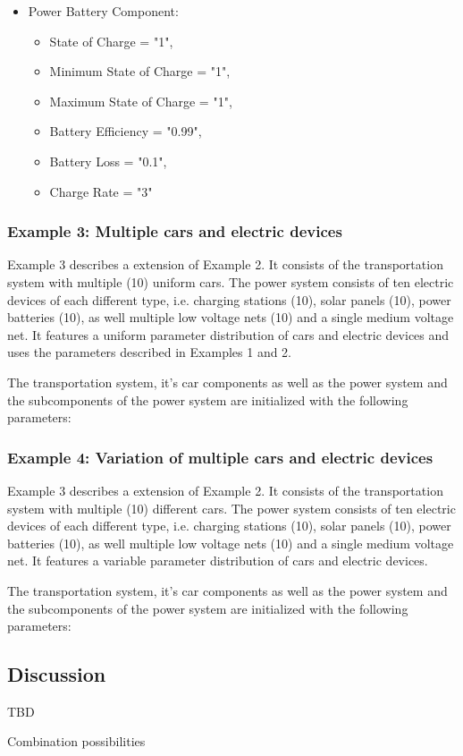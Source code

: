 \begin{itemize}
	\item Power Battery Component:
	\begin{itemize}
		\item State of Charge = "1",
		\item Minimum State of Charge = "1",
		\item Maximum State of Charge = "1", 
		\item Battery Efficiency = "0.99",
		\item Battery Loss = "0.1",
		\item Charge Rate = "3"
	\end{itemize}	
			
\end{itemize}


\subsubsection{Example 3: Multiple cars and electric devices}
Example 3 describes a extension of Example 2. It consists of the transportation system with multiple (10) uniform cars.
The power system consists of ten electric devices of each different type, i.e. charging stations (10), solar panels (10), power batteries (10), as well multiple low voltage nets (10) and a single medium voltage net.
It features a uniform parameter distribution of cars and electric devices and uses the parameters described in Examples 1 and 2.

The transportation system, it's car components as well as the power system and the subcomponents of the power system are initialized with the following parameters:

\subsubsection{Example 4: Variation of multiple cars and electric devices}
Example 3 describes a extension of Example 2. It consists of the transportation system with multiple (10) different cars.
The power system consists of ten electric devices of each different type, i.e. charging stations (10), solar panels (10), power batteries (10), as well multiple low voltage nets (10) and a single medium voltage net.
It features a variable parameter distribution of cars and electric devices.

The transportation system, it's car components as well as the power system and the subcomponents of the power system are initialized with the following parameters:

\subsection{Discussion}
\label{section:discussion}

TBD

Combination possibilities

